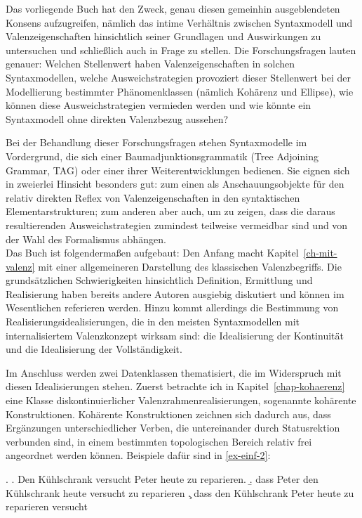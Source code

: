 Das vorliegende Buch hat den Zweck, genau diesen gemeinhin ausgeblendeten Konsens aufzugreifen, nämlich das intime Verhältnis zwischen Syntaxmodell und Valenzeigenschaften hinsichtlich seiner Grundlagen und Auswirkungen zu untersuchen und schlie\ss lich auch in Frage zu stellen. Die Forschungsfragen lauten genauer: Welchen Stellenwert haben Valenzeigenschaften in solchen Syntaxmodellen, welche Ausweichstrategien provoziert dieser Stellenwert bei der Modellierung bestimmter Phänomenklassen (nämlich Kohärenz und Ellipse), wie können diese Ausweichstrategien vermieden werden und wie könnte ein Syntaxmodell ohne direkten Valenzbezug aussehen?

Bei der Behandlung dieser Forschungsfragen stehen Syntaxmodelle im Vordergrund, die sich einer Baumadjunktionsgrammatik (Tree Adjoining Grammar, TAG) oder einer ihrer Weiterentwicklungen bedienen. Sie eignen sich in zweierlei Hinsicht besonders gut: zum einen als Anschauungsobjekte für den relativ direkten Reflex von Valenzeigenschaften in den syntaktischen Elementarstrukturen; zum anderen aber auch, um zu zeigen, dass die daraus resultierenden Ausweichstrategien zumindest teilweise vermeidbar sind und von der Wahl des Formalismus abhängen. \\  

Das Buch ist folgendermaßen aufgebaut: Den Anfang macht Kapitel~\ref{ch-mit-valenz} mit einer allgemeineren Darstellung des klassischen Valenzbegriffs. Die grundsätzlichen Schwierigkeiten hinsichtlich Definition, Ermittlung und Realisierung haben bereits andere Autoren ausgiebig diskutiert und können im Wesentlichen referieren werden. Hinzu kommt allerdings die Bestimmung von Realisierungsidealisierungen, die in den meisten Syntaxmodellen mit internalisiertem Valenzkonzept wirksam sind: die Idealisierung der Kontinuität und die Idealisierung der Vollständigkeit.

Im Anschluss werden zwei Datenklassen thematisiert, die im Widerspruch mit diesen Idealisierungen stehen. Zuerst betrachte ich in Kapitel~\ref{chap-kohaerenz} eine Klasse diskontinuierlicher Valenzrahmenrealisierungen, sogenannte kohärente Konstruktionen. Kohärente Konstruktionen zeichnen sich dadurch aus, dass Ergänzungen unterschiedlicher Verben, die untereinander durch Statusrektion verbunden sind, in einem bestimmten topologischen Bereich relativ frei angeordnet werden können. Beispiele dafür sind in \ref{ex-einf-2}:     
 
  \ex. \label{ex-einf-2}
  \a. \label{ex-einf-2-a}Den Kühlschrank versucht Peter heute zu reparieren.
  \b. \label{ex-einf-2-b}dass Peter den Kühlschrank heute versucht zu reparieren
  \c. \label{ex-einf-2-c}dass den Kühlschrank Peter heute zu reparieren versucht

